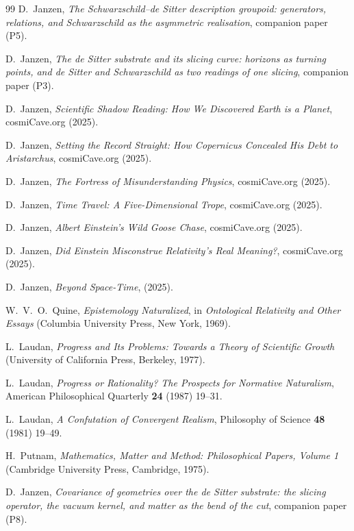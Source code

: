 \documentclass[11pt,a4paper]{article}
\begin{document}
\begin{thebibliography}{99}
D.~Janzen,
\emph{The Schwarzschild--de Sitter description groupoid: generators, relations, and Schwarzschild as the asymmetric realisation}, companion paper (P5).

D.~Janzen,
\emph{The de Sitter substrate and its slicing curve: horizons as turning points, and de Sitter and Schwarzschild as two readings of one slicing}, companion paper (P3).

D.~Janzen,
\emph{Scientific Shadow Reading: How We Discovered Earth is a Planet},
cosmiCave.org (2025).

D.~Janzen,
\emph{Setting the Record Straight: How Copernicus Concealed His Debt to Aristarchus},
cosmiCave.org (2025).

D.~Janzen,
\emph{The Fortress of Misunderstanding Physics},
cosmiCave.org (2025).

D.~Janzen,
\emph{Time Travel: A Five-Dimensional Trope},
cosmiCave.org (2025).

D.~Janzen,
\emph{Albert Einstein's Wild Goose Chase},
cosmiCave.org (2025).

D.~Janzen,
\emph{Did Einstein Misconstrue Relativity's Real Meaning?},
cosmiCave.org (2025).

D.~Janzen,
\emph{Beyond Space-Time},
(2025).

W.~V.~O.~Quine,
\emph{Epistemology Naturalized}, in \emph{Ontological Relativity and Other Essays}
(Columbia University Press, New York, 1969).

L.~Laudan,
\emph{Progress and Its Problems: Towards a Theory of Scientific Growth}
(University of California Press, Berkeley, 1977).

L.~Laudan,
\emph{Progress or Rationality? The Prospects for Normative Naturalism},
American Philosophical Quarterly \textbf{24} (1987) 19--31.

L.~Laudan,
\emph{A Confutation of Convergent Realism},
Philosophy of Science \textbf{48} (1981) 19--49.

H.~Putnam,
\emph{Mathematics, Matter and Method: Philosophical Papers, Volume 1}
(Cambridge University Press, Cambridge, 1975).

D.~Janzen,
\emph{Covariance of geometries over the de Sitter substrate: the slicing operator, the vacuum kernel, and matter as the bend of the cut}, companion paper (P8).


\end{thebibliography}
\end{document}
